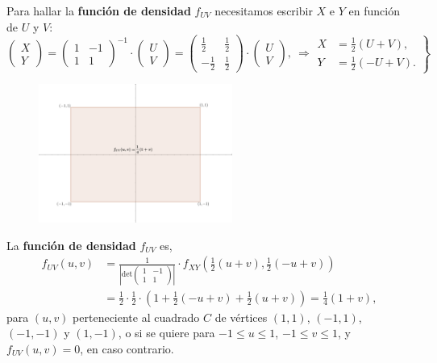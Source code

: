 \documentclass[]{book}
\begin{document}
Para hallar la \textbf{función de densidad} \(f_{UV}\) necesitamos escribir \(X\) e \(Y\) en función de \(U\) y \(V\):
\[
\begin{pmatrix}X\\ Y\end{pmatrix}=\begin{pmatrix}1 & -1\\ 1& 1\end{pmatrix}^{-1}\cdot\begin{pmatrix}U\\ V\end{pmatrix}=\begin{pmatrix}\frac{1}{2} & \frac{1}{2}\\ -\frac{1}{2}& \frac{1}{2}\end{pmatrix}\cdot\begin{pmatrix}U\\ V\end{pmatrix},\ \Rightarrow \left.\begin{array}{rl}X & = \frac{1}{2}(U+V),\\ Y & =\frac{1}{2}(-U+V).\end{array}\right\}
\]

\begin{figure}
\includegraphics[width=2.5in]{Images/EjTranLineal2} \end{figure}

La \textbf{función de densidad} \(f_{UV}\) es,
\[
\begin{array}{rl}
f_{UV}(u,v) & =\frac{1}{\left|\mathrm{det}\begin{pmatrix}1 & -1\\ 1& 1\end{pmatrix}\right|}\cdot f_{XY}\left(\frac{1}{2}(u+v),\frac{1}{2}(-u+v)\right) \\ & =\frac{1}{2}\cdot \frac{1}{2}\cdot \left(1+\frac{1}{2}(-u+v)+\frac{1}{2}(u+v)\right)=\frac{1}{4}(1+v),
\end{array}
\]
para \((u,v)\) perteneciente al cuadrado \(C\) de vértices \((1,1)\), \((-1,1)\), \((-1,-1)\) y \((1,-1)\), o si se quiere para \(-1\leq u\leq 1\), \(-1\leq v\leq 1\), y \(f_{UV}(u,v)=0\), en caso contrario.
\end{document}
